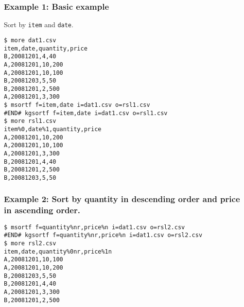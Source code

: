 \subsubsection*{Example 1: Basic example}

Sort by \verb|item| and \verb|date|.


\begin{Verbatim}[baselinestretch=0.7,frame=single]
$ more dat1.csv
item,date,quantity,price
B,20081201,4,40
A,20081201,10,200
A,20081201,10,100
B,20081203,5,50
B,20081201,2,500
A,20081201,3,300
$ msortf f=item,date i=dat1.csv o=rsl1.csv
#END# kgsortf f=item,date i=dat1.csv o=rsl1.csv
$ more rsl1.csv
item%0,date%1,quantity,price
A,20081201,10,200
A,20081201,10,100
A,20081201,3,300
B,20081201,4,40
B,20081201,2,500
B,20081203,5,50
\end{Verbatim}
\subsubsection*{Example 2: Sort by quantity in descending order and price in ascending order.}



\begin{Verbatim}[baselinestretch=0.7,frame=single]
$ msortf f=quantity%nr,price%n i=dat1.csv o=rsl2.csv
#END# kgsortf f=quantity%nr,price%n i=dat1.csv o=rsl2.csv
$ more rsl2.csv
item,date,quantity%0nr,price%1n
A,20081201,10,100
A,20081201,10,200
B,20081203,5,50
B,20081201,4,40
A,20081201,3,300
B,20081201,2,500
\end{Verbatim}
